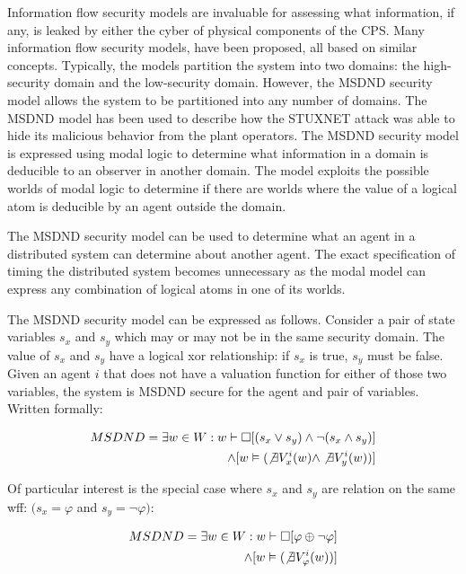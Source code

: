 Information flow security models are invaluable for assessing what information, if any, is leaked by either the cyber of physical components of the \ac{CPS}.
Many information flow security models, have been proposed, all based on similar concepts.
Typically, the models partition the system into two domains: the high-security domain and the low-security domain.
However, the MSDND security model allows the system to be partitioned into any number of domains.
The MSDND model has been used to describe how the STUXNET attack was able to hide its malicious behavior from the plant operators.
The MSDND security model is expressed using modal logic to determine what information in a domain is deducible to an observer in another domain.
The model exploits the possible worlds of modal logic to determine if there are worlds where the value of a logical atom is deducible by an agent outside the domain.

The MSDND security model can be used to determine what an agent in a distributed system can determine about another agent.
The exact specification of timing the distributed system becomes unnecessary as the modal model can express any combination of logical atoms in one of its worlds.\cite{Howser2012}\cite{STUXNET}\cite{Howser2013}

The MSDND security model can be expressed as follows\cite{STUXNET}.
Consider a pair of state variables $s_x$ and $s_y$ which may or may not be in the same security domain.
The value of $s_x$ and $s_y$ have a logical xor relationship: if $s_x$ is true, $s_y$ must be false.
Given an agent $i$ that does not have a valuation function for either of those two variables, the system is MSDND secure for the agent and pair of variables.
Written formally:

\begin{align}
MSDND = \exists w \in W : w \vdash \Box [ (s_x \vee s_y) \wedge \neg(s_x \wedge s_y) ] 
\nonumber \\ \wedge [ w \vDash ( \not \exists V_x^i (w) \wedge \not \exists V_y^i (w) ) ]
\end{align}

Of particular interest is the special case where $s_x$ and $s_y$ are relation on the same wff: $(s_x = \varphi$ and $s_y = \neg \varphi)$:

\begin{align}
MSDND = \exists w \in W : w \vdash \Box [ \varphi \oplus \neg \varphi ] 
\nonumber \\ \wedge [ w \vDash ( \not \exists V_\varphi^i(w)) ]
\end{align}

